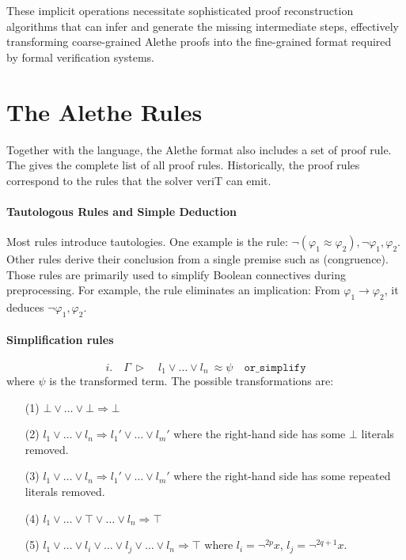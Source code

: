 These implicit operations necessitate sophisticated proof reconstruction algorithms that can infer
and generate the missing intermediate steps, effectively transforming coarse-grained Alethe proofs
into the fine-grained format required by formal verification systems.

\section{The Alethe Rules}

Together with the language, the Alethe format also includes a set of proof rule.
The \cite[\S 5]{alethespec} gives the complete list of all proof rules.
Historically, the proof rules correspond to the rules that the solver veriT can emit.



\paragraph{Tautologous Rules and Simple Deduction}
Most rules introduce tautologies. One example is
the  rule: $\neg (\varphi_1 \approx \varphi_2), \neg \varphi_1, \varphi_2$.
%
Other rules derive their conclusion from a single premise such as  (congruence).
%
Those rules are primarily used to simplify Boolean connectives during preprocessing.
For example, the  rule eliminates an implication: From $\varphi_1 \to \varphi_2$, it deduces $\neg \varphi_1, \varphi_2$.

\paragraph{Simplification rules}

\begin{equation}
i. \quad \Gamma~\triangleright \quad l_1 \lor \dots \lor l_n ~ \approx \psi \quad \texttt{or\_simplify}
\end{equation}
where $\psi$ is the transformed term. The possible transformations are:
\begin{enumerate}
\item[(1)] $\bot \lor \dots \lor \bot \Rightarrow \bot$
\item[(2)] $l_1 \lor \dots \lor l_n \Rightarrow l_1' \lor \dots \lor l_m'$ where the right-hand side has some $\bot$ literals removed.
\item[(3)]  $l_1 \lor \dots \lor l_n \Rightarrow l_1' \lor \dots \lor l_m'$ where the right-hand side has some repeated literals removed.
\item[(4)] $l_1 \lor \dots \lor \top \lor \dots \lor l_n \Rightarrow \top$
\item[(5)] $l_1 \lor \dots \lor l_i \lor \dots \lor l_j \lor \dots \lor  l_n \Rightarrow \top$ where $l_i = \neg^{2p} x$, $l_j = \neg^{2q+1} x$.
\end{enumerate}


